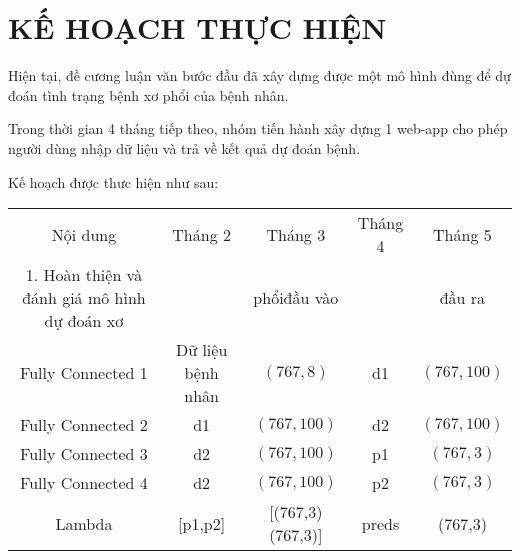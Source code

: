 \chapter{KẾ HOẠCH THỰC HIỆN}
Hiện tại, đề cương luận văn bước đầu đã xây dựng được một mô hình đùng để dự đoán tình trạng bệnh xơ phổi của bệnh nhân.\par
Trong thời gian 4 tháng tiếp theo, nhóm tiến hành xây dựng 1 web-app cho phép người dùng nhập dữ liệu và trả về kết quả dự đoán bệnh. \par
Kế hoạch được thưc hiện như sau:
\begin{center}
\begin{tabular} {|c|c|c|c|c|}
\hline
Nội dung & Tháng 2 & Tháng 3 & Tháng 4 & Tháng 5\\
 1. Hoàn thiện và đánh giá mô hình dự đoán xơ & & phổiđầu vào & &đầu ra\\
\hline
Fully Connected 1 & Dữ liệu bệnh nhân & $(767,8) $ & d1 & $(767,100)$ \\
\hline
Fully Connected 2 & d1 & $(767,100)$ & d2 &$(767,100)$ \\
\hline
Fully Connected 3 & d2 &$(767,100)$ & p1 &$(767,3)$ \\
\hline
Fully Connected 4 & d2 &$(767,100)$ & p2 &$(767,3)$ \\
\hline
Lambda & [p1,p2] & [(767,3)(767,3)] & preds & (767,3)\\
\hline
\end{tabular}
\label{tab:train1}
\end{center}
 